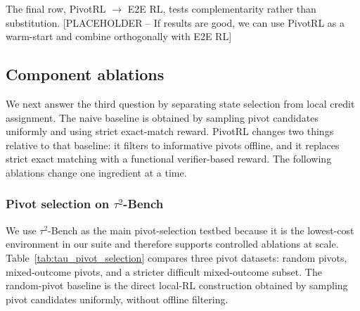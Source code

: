 The final row, PivotRL $\rightarrow$ E2E RL, tests complementarity rather than substitution. [PLACEHOLDER -- If results are good, we can use PivotRL as a warm-start and combine orthogonally with E2E RL]

\subsection{Component ablations}
\label{sec:component_ablations}

We next answer the third question by separating state selection from local credit assignment. The naive baseline is obtained by sampling pivot candidates uniformly and using strict exact-match reward. PivotRL changes two things relative to that baseline: it filters to informative pivots offline, and it replaces strict exact matching with a functional verifier-based reward. The following ablations change one ingredient at a time.

\subsubsection{Pivot selection on $\tau^2$-Bench}
\label{sec:tau_pivot_ablation}

We use $\tau^2$-Bench as the main pivot-selection testbed because it is the lowest-cost environment in our suite and therefore supports controlled ablations at scale. Table~\ref{tab:tau_pivot_selection} compares three pivot datasets: random pivots, mixed-outcome pivots, and a stricter difficult mixed-outcome subset. The random-pivot baseline is the direct local-RL construction obtained by sampling pivot candidates uniformly, without offline filtering.

